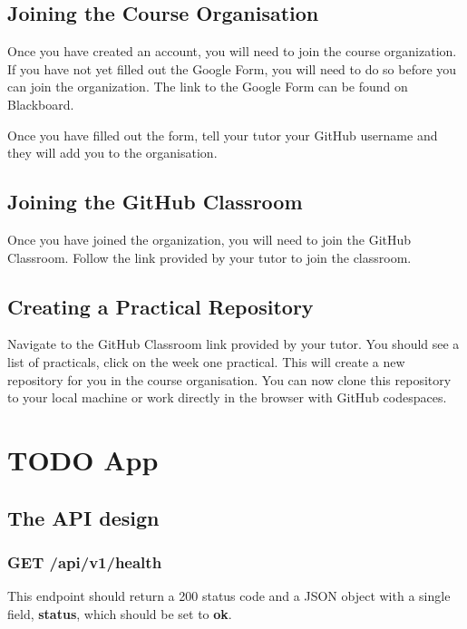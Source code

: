 \documentclass{csse4400}
\begin{document}
\subsection{Joining the Course Organisation}
Once you have created an account, you will need to join the course organization.
If you have not yet filled out the Google Form,
you will need to do so before you can join the organization.
The link to the Google Form can be found on Blackboard.

Once you have filled out the form,
tell your tutor your GitHub username and they will add you to the organisation.

\subsection{Joining the GitHub Classroom}
Once you have joined the organization,
you will need to join the GitHub Classroom.
Follow the link provided by your tutor to join the classroom.

\subsection{Creating a Practical Repository}
Navigate to the GitHub Classroom link provided by your tutor.
You should see a list of practicals, click on the week one practical.
This will create a new repository for you in the course organisation.
You can now clone this repository to your local machine or work directly in the browser with GitHub codespaces.


\section{TODO App}

\subsection{The API design}

\subsubsection{GET /api/v1/health}
This endpoint should return a 200 status code and a JSON object with a single field, \textbf{status}, which should be set to \textbf{ok}.
\end{document}
